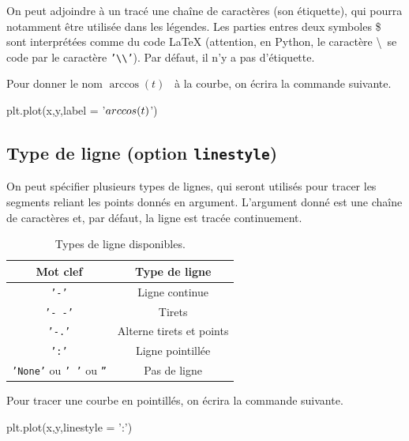 On peut adjoindre à un tracé une chaîne de caractères (son étiquette), qui pourra notamment être utilisée dans les légendes. 
Les parties entres deux symboles \$ sont interprétées comme du code LaTeX  (attention, en Python, le caractère \textbackslash\ se code par le caractère \texttt{'\textbackslash\textbackslash'}). 
Par défaut, il n'y a pas d'étiquette.
\begin{exemple}
  Pour donner le nom \og $\arccos(t)$ \fg\ à la courbe, on écrira la commande suivante.
\begin{pyverbatim}
plt.plot(x,y,label = '$\\arccos(t)$')
\end{pyverbatim}
\end{exemple}
\subsection{Type de ligne (option \texttt{linestyle})}

On peut spécifier plusieurs types de lignes, qui seront utilisés pour tracer les segments reliant les points donnés en argument. 
L'argument donné est une chaîne de caractères et, par défaut, la ligne est tracée continuement. 

\begin{table}[!h]
  \begin{center}
    \begin{tabular}{|c|c|}
      \hline
      Mot clef & Type de ligne \\
      \hline
      \texttt{'-'} & Ligne continue \\
      \hline
      \texttt{'- -'} & Tirets  \\
      \hline
      \texttt{'-.'} & Alterne tirets et points \\
      \hline
      \texttt{':'} & Ligne pointillée \\
      \hline
      \texttt{'None'} ou \texttt{' '} ou \texttt{''} & Pas de ligne \\
      \hline
    \end{tabular}
    \caption{Types de ligne disponibles.}
  \end{center}
\end{table}

\begin{exemple}
  Pour tracer une courbe en pointillés, on écrira la commande suivante.
\begin{pyverbatim}
plt.plot(x,y,linestyle = ':')
\end{pyverbatim}
\end{exemple}

